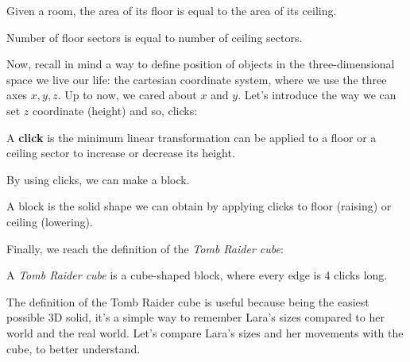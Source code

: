 \begin{remark}
    Given a room, the area of its floor is equal to the area of its ceiling.
\end{remark}

\begin{remark}
    Number of floor sectors is equal to number of ceiling sectors.
\end{remark}

Now, recall in mind a way to define position of objects in the three-dimensional space we live our life: the cartesian coordinate system, where we use the three axes \( x, y, z\).
Up to now, we cared about \(x\) and \(y\). Let's introduce the way we can set \(z\) coordinate (height) and so, clicks:

\begin{remark}
    A \textbf{click} is the minimum linear transformation can be applied to a floor or a ceiling sector to increase or decrease its height.
\end{remark}

By using clicks, we can make a block.

\begin{remark}
    A block is the solid shape we can obtain by applying clicks to floor (raising) or ceiling (lowering).
\end{remark}

Finally, we reach the definition of the \emph{Tomb Raider cube}:
\begin{remark}
    A \emph{Tomb Raider cube} is a cube-shaped block, where every edge is 4 clicks long.
\end{remark}

The definition of the Tomb Raider cube is useful because being the easiest possible 3D solid, it's a simple way to remember Lara's sizes compared to her world and the real world.
Let's compare Lara's sizes and her movements with the cube, to better understand.

